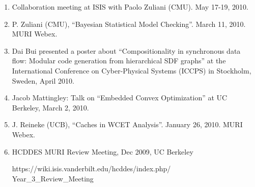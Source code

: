 \begin{enumerate}
\item Collaboration meeting at ISIS with Paolo Zuliani (CMU).  May 17-19, 2010.
\item P. Zuliani (CMU), ``Bayesian Statistical Model Checking''. March 11, 2010. MURI Webex.
\item Dai Bui presented a poster about ``Compositionality in synchronous data ﬂow: Modular code generation from hierarchical SDF graphs'' at the International Conference on Cyber-Physical Systems (ICCPS) in Stockholm, Sweden, April 2010.
\item Jacob Mattingley: Talk on ``Embedded Convex Optimization'' at UC Berkeley, March 2, 2010.
\item J. Reineke (UCB), ``Caches in WCET Analysis''. January 26, 2010. MURI Webex.
\item HCDDES MURI Review Meeting, Dec 2009, UC Berkeley 

https://wiki.isis.vanderbilt.edu/hcddes/index.php/ \\
\indent Year\_3\_Review\_Meeting


\end{enumerate}
